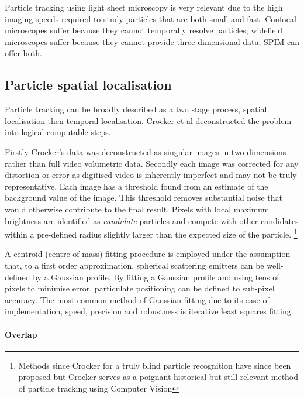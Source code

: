 Particle tracking using light sheet microscopy is very relevant due to the high imaging speeds required to study particles that are both small and fast.
Confocal microscopes suffer because they cannot temporally resolve particles; widefield microscopes suffer because they cannot provide three dimensional data; SPIM can offer both.

\subsection{Particle spatial localisation}

Particle tracking can be broadly described as a two stage process, spatial localisation then temporal localisation.
Crocker et al deconstructed the problem into logical computable steps.

Firstly Crocker's data was deconstructed as singular images in two dimensions rather than full video volumetric data.
Secondly each image was corrected for any distortion or error as digitised video is inherently imperfect and may not be truly representative.
Each image has a threshold found from an estimate of the background value of the image.
This threshold removes substantial noise that would otherwise contribute to the final result.
Pixels with local maximum brightness are identified as \emph{candidate} particles and compete with other candidates within a pre-defined radius slightly larger than the expected size of the particle.
\footnote{Methods since Crocker for a truly blind particle recognition have since been proposed but Crocker serves as a poignant historical but still relevant method of particle tracking using Computer Vision}

A centroid (centre of mass) fitting procedure is employed under the assumption that, to a first order approximation, spherical scattering emitters can be well-defined by a Gaussian profile.
By fitting a Gaussian profile and using tens of pixels to minimise error, particulate positioning can be defined to sub-pixel accuracy.
The most common method of Gaussian fitting due to its ease of implementation, speed, precision and robustness is iterative least squares fitting.

\paragraph{Overlap}

